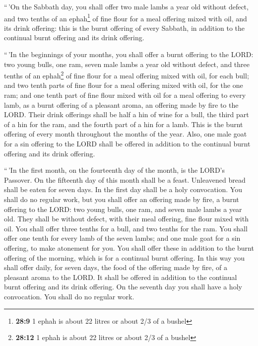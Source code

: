  ``\,'On the Sabbath day, you shall offer two male lambs a
year old without defect, and two tenths of an ephah\footnote{\textbf{28:9}
  1 ephah is about 22 litres or about 2/3 of a bushel} of fine flour for
a meal offering mixed with oil, and its drink offering: 
this is the burnt offering of every Sabbath, in addition to the
continual burnt offering and its drink offering.

 ``\,'In the beginnings of your months, you shall offer a
burnt offering to the LORD: two young bulls, one ram, seven male lambs a
year old without defect,  and three tenths of an
ephah\footnote{\textbf{28:12} 1 ephah is about 22 litres or about 2/3 of
  a bushel} of fine flour for a meal offering mixed with oil, for each
bull; and two tenth parts of fine flour for a meal offering mixed with
oil, for the one ram;  and one tenth part of fine flour
mixed with oil for a meal offering to every lamb, as a burnt offering of
a pleasant aroma, an offering made by fire to the LORD. 
Their drink offerings shall be half a hin of wine for a bull, the third
part of a hin for the ram, and the fourth part of a hin for a lamb. This
is the burnt offering of every month throughout the months of the year.
 Also, one male goat for a sin offering to the LORD shall
be offered in addition to the continual burnt offering and its drink
offering.

 ``\,'In the first month, on the fourteenth day of the
month, is the LORD's Passover.  On the fifteenth day of
this month shall be a feast. Unleavened bread shall be eaten for seven
days.  In the first day shall be a holy convocation. You
shall do no regular work,  but you shall offer an
offering made by fire, a burnt offering to the LORD: two young bulls,
one ram, and seven male lambs a year old. They shall be without defect,
 with their meal offering, fine flour mixed with oil. You
shall offer three tenths for a bull, and two tenths for the ram.
 You shall offer one tenth for every lamb of the seven
lambs;  and one male goat for a sin offering, to make
atonement for you.  You shall offer these in addition to
the burnt offering of the morning, which is for a continual burnt
offering.  In this way you shall offer daily, for seven
days, the food of the offering made by fire, of a pleasant aroma to the
LORD. It shall be offered in addition to the continual burnt offering
and its drink offering.  On the seventh day you shall
have a holy convocation. You shall do no regular work.

